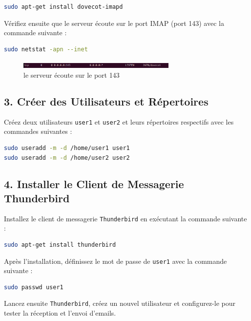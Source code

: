 \begin{lstlisting}[language=bash]
sudo apt-get install dovecot-imapd
\end{lstlisting}

Vérifiez ensuite que le serveur écoute sur le port IMAP (port 143) avec la commande suivante :

\begin{lstlisting}[language=bash]
sudo netstat -apn --inet
\end{lstlisting}

\begin{figure}[h]
	\centering
	\includegraphics[width=0.7\textwidth]{SMTP/143.png}
	\caption{le serveur écoute sur le port 143}
	\label{fig:cmd}
\end{figure}

\subsection*{3. Créer des Utilisateurs et Répertoires}
Créez deux utilisateurs \texttt{user1} et \texttt{user2} et leurs répertoires respectifs avec les commandes suivantes :

\begin{lstlisting}[language=bash]
sudo useradd -m -d /home/user1 user1
sudo useradd -m -d /home/user2 user2
\end{lstlisting}

\subsection*{4. Installer le Client de Messagerie Thunderbird}
Installez le client de messagerie \texttt{Thunderbird} en exécutant la commande suivante :

\begin{lstlisting}[language=bash]
sudo apt-get install thunderbird
\end{lstlisting}

Après l'installation, définissez le mot de passe de \texttt{user1} avec la commande suivante :

\begin{lstlisting}[language=bash]
sudo passwd user1
\end{lstlisting}

Lancez ensuite \texttt{Thunderbird}, créez un nouvel utilisateur et configurez-le pour tester la réception et l'envoi d'emails.

